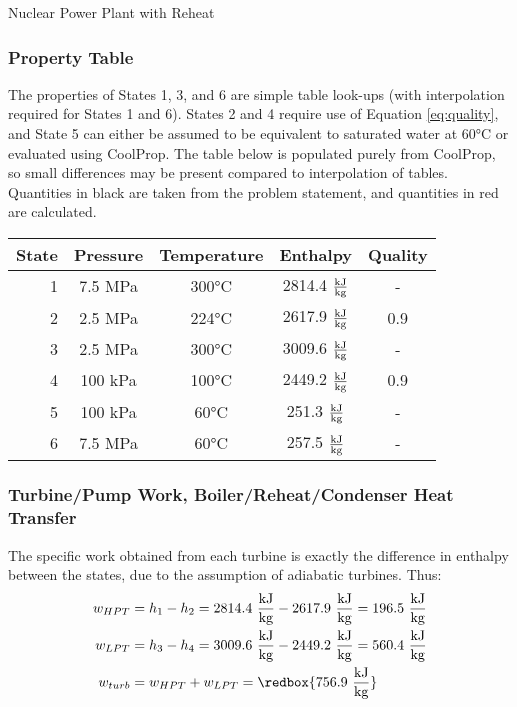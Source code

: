 \begin{example}[label=ex:ch4_supercrit]{Nuclear Power Plant with Reheat}
  \subsubsection*{Property Table}
  The properties of States 1, 3, and 6 are simple table look-ups (with interpolation required for States 1 and 6).  States 2 and 4 require use of Equation \ref{eq:quality}, and State 5 can either be assumed to be equivalent to saturated water at 60°C or evaluated using CoolProp.  The table below is populated purely from CoolProp, so small differences may be present compared to interpolation of tables.  Quantities in black are taken from the problem statement, and quantities in red are calculated.
  \begin{table}[H]
    \centering
    \def\arraystretch{1.5}
    \begin{tabular}{r|cccc}
      State & Pressure & Temperature & Enthalpy & Quality \\ \hline
      1 & 7.5 MPa & 300°C & {\color{Red} 2814.4 $\frac{\rm kJ}{\rm kg}$} & - \\
      2 & 2.5 MPa & {\color{Red} 224°C} & {\color{Red} 2617.9 $\frac{\rm kJ}{\rm kg}$} & 0.9 \\
      3 & 2.5 MPa & 300°C & {\color{Red} 3009.6 $\frac{\rm kJ}{\rm kg}$} & - \\
      4 & 100 kPa & {\color{Red} 100°C} & {\color{Red} 2449.2 $\frac{\rm kJ}{\rm kg}$} & 0.9 \\
      5 & 100 kPa & 60°C & {\color{Red} 251.3 $\frac{\rm kJ}{\rm kg}$} & - \\
      6 & 7.5 MPa & 60°C & {\color{Red} 257.5 $\frac{\rm kJ}{\rm kg}$} & - 
    \end{tabular}
    \def\arraystretch{1.0}
  \end{table}
  \subsubsection*{Turbine/Pump Work, Boiler/Reheat/Condenser Heat Transfer}
  The specific work obtained from each turbine is exactly the difference in enthalpy between the states, due to the assumption of adiabatic turbines.  Thus:
  \begin{align*}
    w_{HPT} &= h_1 - h_2 = 2814.4\ \frac{\rm kJ}{\rm kg} - 2617.9\ \frac{\rm kJ}{\rm kg} = 196.5\ \frac{\rm kJ}{\rm kg} \\
    w_{LPT} &= h_3 - h_4 = 3009.6\ \frac{\rm kJ}{\rm kg} - 2449.2\ \frac{\rm kJ}{\rm kg} = 560.4\ \frac{\rm kJ}{\rm kg} \\
    w_{turb} &= w_{HPT} + w_{LPT} = \redbox{756.9\ \frac{\rm kJ}{\rm kg}}
  \end{align*}


\end{example}

